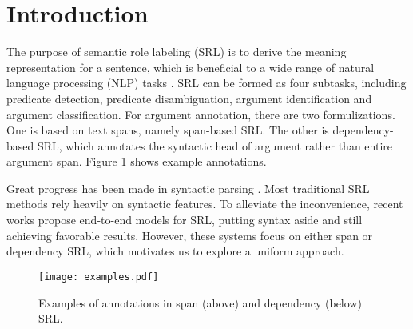 \documentclass[letterpaper]{article} \usepackage{aaai19}  \usepackage{times}  \usepackage{helvet}  \usepackage{courier}  \usepackage{url}  \usepackage{graphicx}  \frenchspacing  \setlength{\pdfpagewidth}{8.5in}  \setlength{\pdfpageheight}{11in}
\begin{document}
\section{Introduction}
The purpose of semantic role labeling (SRL) is to derive the meaning representation for a sentence, which is beneficial to a wide range of natural language processing (NLP) tasks \cite{wang2016bilingual,zhang2018know}. SRL can be formed as four subtasks, including predicate detection, predicate disambiguation, argument identification and argument classification. For argument annotation, there are two formulizations. One is based on text spans, namely span-based SRL. The other is dependency-based SRL, which annotates the syntactic head of argument rather than entire argument span. Figure \ref{fig:example} shows example annotations.


Great progress has been made in syntactic parsing \cite{dozat2017deep,li2018seq2seq,li2018joint}. Most traditional SRL methods rely heavily on syntactic features. To alleviate the inconvenience, recent works \cite{zhou-xu2015,marcheggiani2017,he-acl2017,selfatt2018,he2018jointly,he:2018Syntax,cai2018full} propose end-to-end models for SRL, putting syntax aside and still achieving favorable results. However, these systems focus on either span or dependency SRL,
which motivates us to explore a uniform approach. 

\begin{figure}
	\centering
	\texttt{[image: examples.pdf]}
	\caption{\label{fig:example} Examples of annotations in span (above) and dependency (below) SRL.}
\end{figure}
\end{document}
